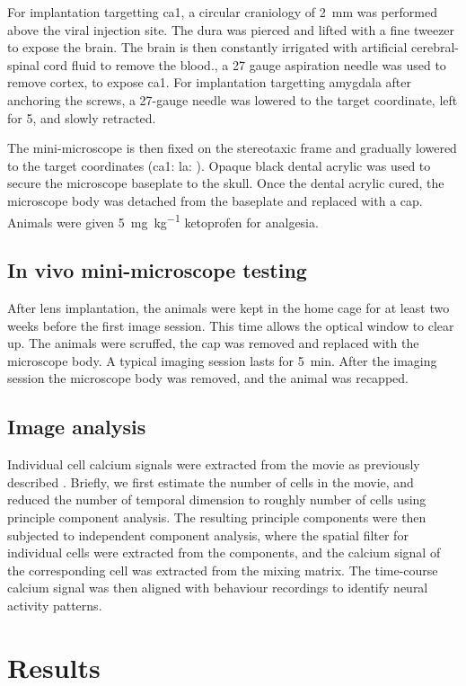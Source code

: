 For implantation targetting \gls{ca1}, a circular craniology of \SI{2}{\mm} was performed above the viral injection site. The dura was pierced and lifted with a fine tweezer to expose the brain. The brain is then constantly irrigated with artificial cerebral-spinal cord fluid to remove the blood., a 27 gauge aspiration needle was used to remove cortex, to expose \gls{ca1}. For implantation targetting amygdala after anchoring the screws, a 27-gauge needle was lowered to the target coordinate, left for \SI{5}{\min}, and slowly retracted.

The mini-microscope is then fixed on the stereotaxic frame and gradually lowered to the target coordinates (\gls{ca1}: \gls{la}: ). Opaque black dental acrylic was used to secure the microscope baseplate to the skull. Once the dental acrylic cured, the microscope body was detached from the baseplate and replaced with a cap. Animals were given \SI{5}{\mg\per\kg} ketoprofen for analgesia.

\subsection{In vivo mini-microscope testing}
After lens implantation, the animals were kept in the home cage for at least two weeks before the first image session. This time allows the optical window to clear up. The animals were scruffed, the cap was removed and replaced with the microscope body. A typical imaging session lasts for \SI{5}{\minute}. After the imaging session the microscope body was removed, and the animal was recapped.

\subsection{Image analysis}
Individual cell calcium signals were extracted from the movie as previously described \citep{mukamel09}. Briefly, we first estimate the number of cells in the movie, and reduced the number of temporal dimension to roughly number of cells using principle component analysis. The resulting principle components were then subjected to independent component analysis, where the spatial filter for individual cells were extracted from the components, and the calcium signal of the corresponding cell was extracted from the mixing matrix. The time-course calcium signal was then aligned with behaviour recordings to identify neural activity patterns.


\section{Results}

